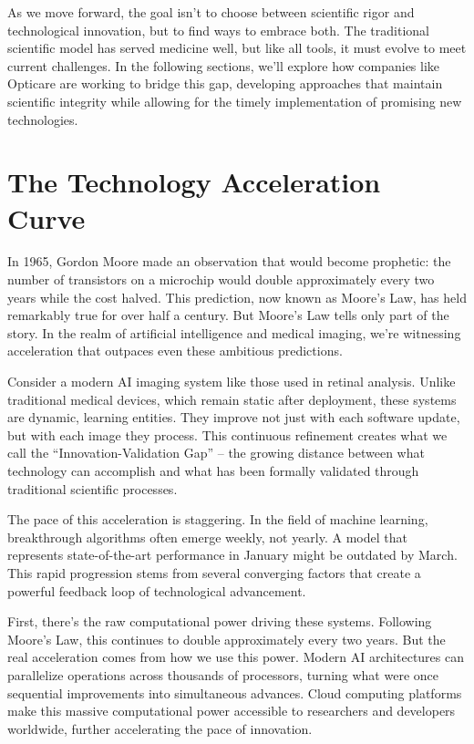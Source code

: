 \documentclass[
  Letterpaper,
]{scrbook}
\begin{document}
As we move forward, the goal isn't to choose between scientific rigor
and technological innovation, but to find ways to embrace both. The
traditional scientific model has served medicine well, but like all
tools, it must evolve to meet current challenges. In the following
sections, we'll explore how companies like Opticare are working to
bridge this gap, developing approaches that maintain scientific
integrity while allowing for the timely implementation of promising new
technologies.

\section{The Technology Acceleration
Curve}\label{the-technology-acceleration-curve}

In 1965, Gordon Moore made an observation that would become prophetic:
the number of transistors on a microchip would double approximately
every two years while the cost halved. This prediction, now known as
Moore's Law, has held remarkably true for over half a century. But
Moore's Law tells only part of the story. In the realm of artificial
intelligence and medical imaging, we're witnessing acceleration that
outpaces even these ambitious predictions.

Consider a modern AI imaging system like those used in retinal analysis.
Unlike traditional medical devices, which remain static after
deployment, these systems are dynamic, learning entities. They improve
not just with each software update, but with each image they process.
This continuous refinement creates what we call the
``Innovation-Validation Gap'' -- the growing distance between what
technology can accomplish and what has been formally validated through
traditional scientific processes.

The pace of this acceleration is staggering. In the field of machine
learning, breakthrough algorithms often emerge weekly, not yearly. A
model that represents state-of-the-art performance in January might be
outdated by March. This rapid progression stems from several converging
factors that create a powerful feedback loop of technological
advancement.

First, there's the raw computational power driving these systems.
Following Moore's Law, this continues to double approximately every two
years. But the real acceleration comes from how we use this power.
Modern AI architectures can parallelize operations across thousands of
processors, turning what were once sequential improvements into
simultaneous advances. Cloud computing platforms make this massive
computational power accessible to researchers and developers worldwide,
further accelerating the pace of innovation.
\end{document}
